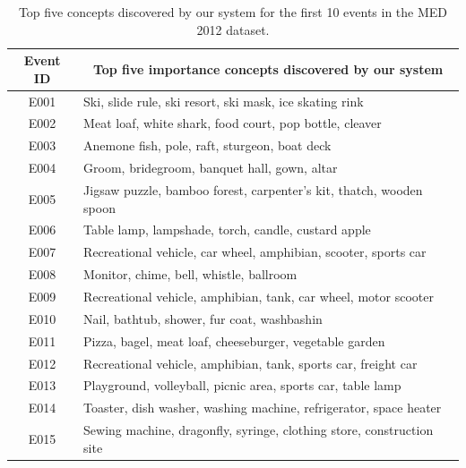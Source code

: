 \begin{table}
		\centering
		\caption{Top five concepts discovered by our system for the first 10 events in the MED 2012 dataset.}
	\begin{tabular}{|c|l|}
		\hline
		\textbf{Event ID} & \multicolumn{1}{c|}{\textbf{Top five importance concepts discovered by our system}} \\ \hline
		E001              & Ski, slide rule, ski resort, ski mask, ice skating rink                             \\ \hline
		E002              & Meat loaf, white shark, food court, pop bottle, cleaver                             \\ \hline
		E003              & Anemone fish, pole, raft, sturgeon, boat deck                                       \\ \hline
		E004              & Groom, bridegroom, banquet hall, gown, altar                                        \\ \hline
		E005              & Jigsaw puzzle, bamboo forest, carpenter's kit, thatch, wooden spoon                 \\ \hline
		E006              & Table lamp, lampshade, torch, candle, custard apple                                 \\ \hline
		E007              & Recreational vehicle, car wheel, amphibian, scooter, sports car                     \\ \hline
		E008              & Monitor, chime, bell, whistle, ballroom                                             \\ \hline
		E009              & Recreational vehicle, amphibian, tank, car wheel, motor scooter                     \\ \hline
		E010              & Nail, bathtub, shower, fur coat, washbashin                                         \\ \hline
		E011              & Pizza, bagel, meat loaf, cheeseburger, vegetable garden                             \\ \hline
		E012              & Recreational vehicle, amphibian, tank, sports car, freight car                      \\ \hline
		E013              & Playground, volleyball, picnic area, sports car, table lamp                         \\ \hline
		E014              & Toaster, dish washer, washing machine, refrigerator, space heater                   \\ \hline
		E015              & Sewing machine, dragonfly, syringe, clothing store, construction site               \\ \hline

\end{tabular}
\end{table}

